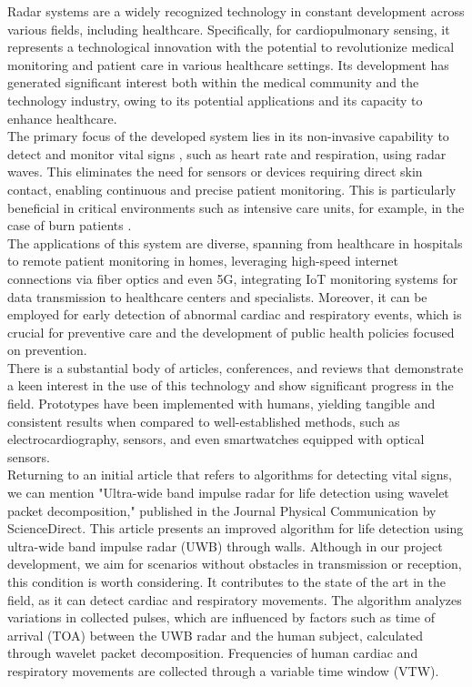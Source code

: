 \documentclass[lettersize,journal]{IEEEtran}
\begin{document}
Radar systems are a widely recognized technology in constant development across various fields, including healthcare. Specifically, for cardiopulmonary sensing, it represents a technological innovation with the potential to revolutionize medical monitoring and patient care in various healthcare settings. Its development has generated significant interest both within the medical community and the technology industry, owing to its potential applications and its capacity to enhance healthcare.\\


The primary focus of the developed system lies in its non-invasive capability to detect and monitor vital signs \cite{luAccurateHeartBeat2023a}, such as heart rate and respiration, using radar waves. This eliminates the need for sensors or devices requiring direct skin contact, enabling continuous and precise patient monitoring. This is particularly beneficial in critical environments such as intensive care units, for example, in the case of burn patients \cite{luAccurateHeartBeat2023a}.\\

The applications of this system are diverse, spanning from healthcare in hospitals to remote patient monitoring in homes, leveraging high-speed internet connections via fiber optics and even 5G, integrating IoT monitoring systems for data transmission to healthcare centers and specialists. Moreover, it can be employed for early detection of abnormal cardiac and respiratory events, which is crucial for preventive care and the development of public health policies focused on prevention.\\

There is a substantial body of articles, conferences, and reviews that demonstrate a keen interest in the use of this technology and show significant progress in the field. Prototypes have been implemented with humans, yielding tangible and consistent results when compared to well-established methods, such as electrocardiography, sensors, and even smartwatches equipped with optical sensors.\\

Returning to an initial article that refers to algorithms for detecting vital signs, we can mention "Ultra-wide band impulse radar for life detection using wavelet packet decomposition," \cite{LIANG201831} published in the Journal Physical Communication by ScienceDirect. This article presents an improved algorithm for life detection using ultra-wide band impulse radar (UWB) \cite{kakouche}through walls. Although in our project development, we aim for scenarios without obstacles in transmission or reception, this condition is worth considering. It contributes to the state of the art in the field, as it can detect cardiac and respiratory movements. The algorithm analyzes variations in collected pulses, which are influenced by factors such as time of arrival (TOA) between the UWB radar and the human subject, calculated through wavelet packet decomposition. Frequencies of human cardiac and respiratory movements are collected through a variable time window (VTW).\\
\end{document}
